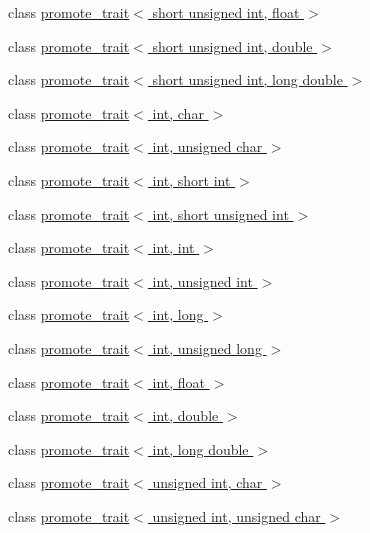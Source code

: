 \begin{DoxyCompactItemize}
\item 
class \hyperlink{classpromote__trait_3_01short_01unsigned_01int_00_01float_01_4}{promote\+\_\+trait$<$ short unsigned int, float $>$}
\item 
class \hyperlink{classpromote__trait_3_01short_01unsigned_01int_00_01double_01_4}{promote\+\_\+trait$<$ short unsigned int, double $>$}
\item 
class \hyperlink{classpromote__trait_3_01short_01unsigned_01int_00_01long_01double_01_4}{promote\+\_\+trait$<$ short unsigned int, long double $>$}
\item 
class \hyperlink{classpromote__trait_3_01int_00_01char_01_4}{promote\+\_\+trait$<$ int, char $>$}
\item 
class \hyperlink{classpromote__trait_3_01int_00_01unsigned_01char_01_4}{promote\+\_\+trait$<$ int, unsigned char $>$}
\item 
class \hyperlink{classpromote__trait_3_01int_00_01short_01int_01_4}{promote\+\_\+trait$<$ int, short int $>$}
\item 
class \hyperlink{classpromote__trait_3_01int_00_01short_01unsigned_01int_01_4}{promote\+\_\+trait$<$ int, short unsigned int $>$}
\item 
class \hyperlink{classpromote__trait_3_01int_00_01int_01_4}{promote\+\_\+trait$<$ int, int $>$}
\item 
class \hyperlink{classpromote__trait_3_01int_00_01unsigned_01int_01_4}{promote\+\_\+trait$<$ int, unsigned int $>$}
\item 
class \hyperlink{classpromote__trait_3_01int_00_01long_01_4}{promote\+\_\+trait$<$ int, long $>$}
\item 
class \hyperlink{classpromote__trait_3_01int_00_01unsigned_01long_01_4}{promote\+\_\+trait$<$ int, unsigned long $>$}
\item 
class \hyperlink{classpromote__trait_3_01int_00_01float_01_4}{promote\+\_\+trait$<$ int, float $>$}
\item 
class \hyperlink{classpromote__trait_3_01int_00_01double_01_4}{promote\+\_\+trait$<$ int, double $>$}
\item 
class \hyperlink{classpromote__trait_3_01int_00_01long_01double_01_4}{promote\+\_\+trait$<$ int, long double $>$}
\item 
class \hyperlink{classpromote__trait_3_01unsigned_01int_00_01char_01_4}{promote\+\_\+trait$<$ unsigned int, char $>$}
\item 
class \hyperlink{classpromote__trait_3_01unsigned_01int_00_01unsigned_01char_01_4}{promote\+\_\+trait$<$ unsigned int, unsigned char $>$}

\end{DoxyCompactItemize}
